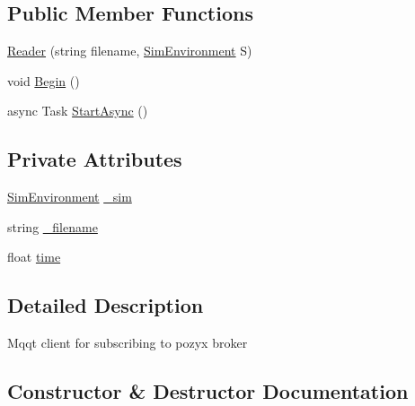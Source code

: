 \subsection*{Public Member Functions}
\begin{DoxyCompactItemize}
\item 
\hyperlink{class_pozyx_positioner_1_1_framework_1_1_reader_a75e25782cb62520a4c9dfe5b1319fdd9}{Reader} (string filename, \hyperlink{class_pozyx_positioner_1_1_framework_1_1_sim_environment}{Sim\+Environment} S)
\item 
void \hyperlink{class_pozyx_positioner_1_1_framework_1_1_reader_aec87a650a91ac217fd0e3d7aece3484a}{Begin} ()
\item 
async Task \hyperlink{class_pozyx_positioner_1_1_framework_1_1_reader_aa384522a8caca942f2becd73031ac77d}{Start\+Async} ()
\end{DoxyCompactItemize}
\subsection*{Private Attributes}
\begin{DoxyCompactItemize}
\item 
\hyperlink{class_pozyx_positioner_1_1_framework_1_1_sim_environment}{Sim\+Environment} \hyperlink{class_pozyx_positioner_1_1_framework_1_1_reader_ad672719ee98609332039e9cd704379a3}{\+\_\+sim}
\item 
string \hyperlink{class_pozyx_positioner_1_1_framework_1_1_reader_a3237b06ed20b2c6ba44bdfdbba3d29e9}{\+\_\+filename}
\item 
float \hyperlink{class_pozyx_positioner_1_1_framework_1_1_reader_a0b277d104268d75fa8c84fa407ac505c}{time}
\end{DoxyCompactItemize}


\subsection{Detailed Description}
Mqqt client for subscribing to pozyx broker 



\subsection{Constructor \& Destructor Documentation}
\mbox{\label{class_pozyx_positioner_1_1_framework_1_1_reader_a75e25782cb62520a4c9dfe5b1319fdd9}} 
